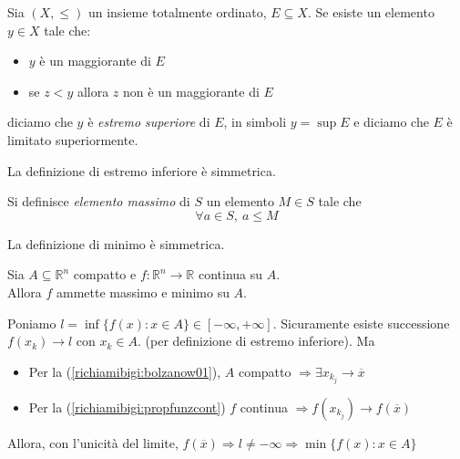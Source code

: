 \begin{defn}
Sia $(X,\leq)$ un insieme totalmente ordinato, $E\subseteq X$.
 Se esiste un elemento $y\in X$ tale che:
\begin{itemize}
\item $y$ è un maggiorante di $E$
\item se $z<y$ allora $z$ non è un maggiorante di $E$
\end{itemize}
diciamo che $y$ è \emph{estremo superiore} di $E$, in simboli
 $y=\sup E$ e diciamo che $E$ è limitato superiormente.
\end{defn}
La definizione di estremo inferiore è simmetrica.

\begin{defn}[Massimo]
Si definisce \emph{elemento massimo} di $S$  un elemento $M \in S$
 tale che
$$\forall a \in S,\ a\leq M$$
\end{defn}
La definizione di minimo è simmetrica.


\begin{theo}
 Sia $A \subseteq \mathbb{R}^n$ compatto e
 $f: \mathbb{R}^{n} \rightarrow \mathbb{R}$ continua su $A$. \\
Allora $f$ ammette massimo e minimo su $A$.
\end{theo}

\begin{thproof}
Poniamo $ l = \inf \{f(x):  x \in A \} \in [ -\infty, + \infty]$.
Sicuramente esiste successione $f(x_k) \rightarrow l$ con $x_k \in A$. (per definizione di estremo inferiore). Ma
\begin{itemize}
\item Per la  (\ref{richiamibigi:bolzanow01}), $A$ compatto $\Rightarrow \exists x_{k_{j}} \rightarrow \overline{x}$

\item  Per la  (\ref{richiamibigi:propfunzcont})
$f$ continua $\Rightarrow  f(x_{k_{j}}) \rightarrow f(\overline{x})$ 
\end{itemize}
Allora, con l'unicità del limite,
 $f(\overline{x}) \Rightarrow l \neq -\infty \Rightarrow 
\min \{f(x): x \in A \}$

\end{thproof}

